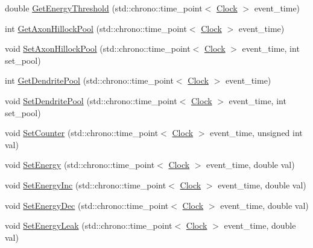 \begin{DoxyCompactItemize}
\item 
double \mbox{\hyperlink{classSoma_a0b45cc454565027bb25daa1396056a7e}{Get\+Energy\+Threshold}} (std\+::chrono\+::time\+\_\+point$<$ \mbox{\hyperlink{universe_8h_a0ef8d951d1ca5ab3cfaf7ab4c7a6fd80}{Clock}} $>$ event\+\_\+time)
\item 
int \mbox{\hyperlink{classSoma_a23dc309849522d9f857fdcc71ea85877}{Get\+Axon\+Hillock\+Pool}} (std\+::chrono\+::time\+\_\+point$<$ \mbox{\hyperlink{universe_8h_a0ef8d951d1ca5ab3cfaf7ab4c7a6fd80}{Clock}} $>$ event\+\_\+time)
\item 
void \mbox{\hyperlink{classSoma_a67cdb8d00b7130b44d4ac75468f4b385}{Set\+Axon\+Hillock\+Pool}} (std\+::chrono\+::time\+\_\+point$<$ \mbox{\hyperlink{universe_8h_a0ef8d951d1ca5ab3cfaf7ab4c7a6fd80}{Clock}} $>$ event\+\_\+time, int set\+\_\+pool)
\item 
int \mbox{\hyperlink{classSoma_a000d9eca00c61af853fd81a2c1569b0e}{Get\+Dendrite\+Pool}} (std\+::chrono\+::time\+\_\+point$<$ \mbox{\hyperlink{universe_8h_a0ef8d951d1ca5ab3cfaf7ab4c7a6fd80}{Clock}} $>$ event\+\_\+time)
\item 
void \mbox{\hyperlink{classSoma_a08260f4dfa8f736611fb924cfd03c4ec}{Set\+Dendrite\+Pool}} (std\+::chrono\+::time\+\_\+point$<$ \mbox{\hyperlink{universe_8h_a0ef8d951d1ca5ab3cfaf7ab4c7a6fd80}{Clock}} $>$ event\+\_\+time, int set\+\_\+pool)
\item 
void \mbox{\hyperlink{classSoma_a9ef49d3fea8c0fbe6513f3910339f736}{Set\+Counter}} (std\+::chrono\+::time\+\_\+point$<$ \mbox{\hyperlink{universe_8h_a0ef8d951d1ca5ab3cfaf7ab4c7a6fd80}{Clock}} $>$ event\+\_\+time, unsigned int val)
\item 
void \mbox{\hyperlink{classSoma_a0d1c0271fc8eeacd6e8836f751dff331}{Set\+Energy}} (std\+::chrono\+::time\+\_\+point$<$ \mbox{\hyperlink{universe_8h_a0ef8d951d1ca5ab3cfaf7ab4c7a6fd80}{Clock}} $>$ event\+\_\+time, double val)
\item 
void \mbox{\hyperlink{classSoma_a414afd7eb780e29a432603198a9838ed}{Set\+Energy\+Inc}} (std\+::chrono\+::time\+\_\+point$<$ \mbox{\hyperlink{universe_8h_a0ef8d951d1ca5ab3cfaf7ab4c7a6fd80}{Clock}} $>$ event\+\_\+time, double val)
\item 
void \mbox{\hyperlink{classSoma_a37081f7a8fc7832f8e89629221ddb8a6}{Set\+Energy\+Dec}} (std\+::chrono\+::time\+\_\+point$<$ \mbox{\hyperlink{universe_8h_a0ef8d951d1ca5ab3cfaf7ab4c7a6fd80}{Clock}} $>$ event\+\_\+time, double val)
\item 
void \mbox{\hyperlink{classSoma_abca59a00940ca2d9c005a84b6785c12f}{Set\+Energy\+Leak}} (std\+::chrono\+::time\+\_\+point$<$ \mbox{\hyperlink{universe_8h_a0ef8d951d1ca5ab3cfaf7ab4c7a6fd80}{Clock}} $>$ event\+\_\+time, double val)

\end{DoxyCompactItemize}
